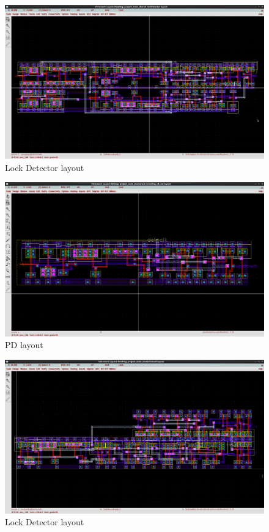\documentclass[a4paper,12pt]{article} \usepackage{graphicx}
\begin{document}
\begin{figure}[h]
  \centering
  \includegraphics[width=1.0\textwidth]{../Bilder/Layout/lock_detector.png}
  \caption{Lock Detector layout}
  \label{fig:LD}
\end{figure}

\begin{figure}[h]
  \centering
  \includegraphics[width=1.0\textwidth]{../Bilder/Layout/pd_including_clk_set.png}
  \caption{PD layout}
  \label{fig:pd_final}
\end{figure}

\begin{figure}[h]
  \centering
  \includegraphics[width=1.0\textwidth]{../Bilder/Layout/bitcell.png}
  \caption{Lock Detector layout}
  \label{fig:bitcell_final}
\end{figure}
\end{document}
